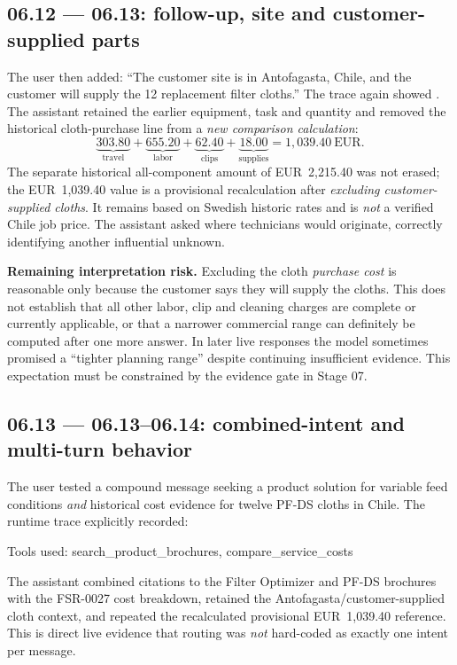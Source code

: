 \documentclass[11pt,a4paper]{article}
\DeclareRobustCommand{\code}[1]{{\ttfamily\small\detokenize{#1}}}
\begin{document}
\subsection{06.12 --- 06.13: follow-up, site and customer-supplied parts}
The user then added: ``The customer site is in Antofagasta, Chile, and the customer will supply the 12 replacement filter cloths.'' The trace again showed \code{compare_service_costs}. The assistant retained the earlier equipment, task and quantity and removed the historical cloth-purchase line from a \emph{new comparison calculation}:
\[
\underbrace{303.80}_{\text{travel}} + \underbrace{655.20}_{\text{labor}} + \underbrace{62.40}_{\text{clips}} + \underbrace{18.00}_{\text{supplies}} = \boxed{1{,}039.40\ \text{EUR}}.
\]
The separate historical all-component amount of EUR~2,215.40 was not erased; the EUR~1,039.40 value is a provisional recalculation after \emph{excluding customer-supplied cloths}. It remains based on Swedish historic rates and is \emph{not} a verified Chile job price. The assistant asked where technicians would originate, correctly identifying another influential unknown.

\begin{warnbox}
\textbf{Remaining interpretation risk.} Excluding the cloth \emph{purchase cost} is reasonable only because the customer says they will supply the cloths. This does not establish that all other labor, clip and cleaning charges are complete or currently applicable, or that a narrower commercial range can definitely be computed after one more answer. In later live responses the model sometimes promised a ``tighter planning range'' despite continuing insufficient evidence. This expectation must be constrained by the evidence gate in Stage 07.
\end{warnbox}

\subsection{06.13 --- 06.13--06.14: combined-intent and multi-turn behavior}
The user tested a compound message seeking a product solution for variable feed conditions \emph{and} historical cost evidence for twelve PF-DS cloths in Chile. The runtime trace explicitly recorded:
\begin{examplebox}
\small\ttfamily
Tools used: search\_product\_brochures, compare\_service\_costs
\end{examplebox}
The assistant combined citations to the Filter Optimizer and PF-DS brochures with the FSR-0027 cost breakdown, retained the Antofagasta/customer-supplied cloth context, and repeated the recalculated provisional EUR~1,039.40 reference. This is direct live evidence that routing was \emph{not} hard-coded as exactly one intent per message.
\end{document}
